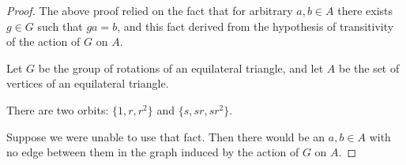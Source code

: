\begin{proof}
  The above proof relied on the fact that for arbitrary $a, b \in A$ there exists $g \in G$ such
  that $ga = b$, and this fact derived from the hypothesis of transitivity of the action of $G$
  on $A$.

  Let $G$ be the group of rotations of an equilateral triangle, and let $A$ be the set of vertices
  of an equilateral triangle.

  There are two orbits: $\{1, r, r^2\}$ and $\{s, sr, sr^2\}$.






  Suppose we were unable to use that fact. Then there would be an $a, b \in A$ with no edge between
  them in the graph induced by the action of $G$ on $A$.
\end{proof}
